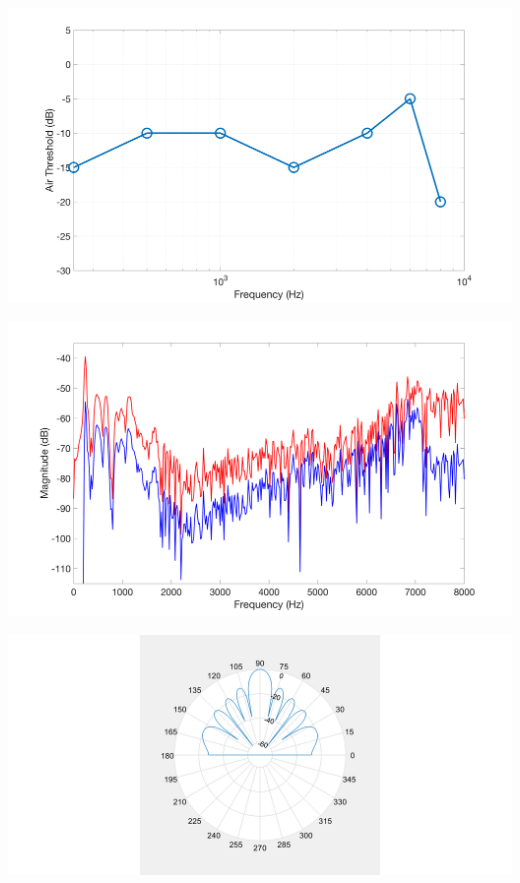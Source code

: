\documentclass[landscape,a1paper,fontscale=0.45]{baposter} %
\begin{document}
\begin{poster}
{\begin{multicols}{2}
\begin{center}
	\includegraphics[width=0.8\linewidth]{audiogram.png}
\end{center}
\begin{center}
	\includegraphics[width=0.8\linewidth]{fftSoftwareBold.png}
\end{center}

\end{multicols}

\begin{multicols}{2}
	\vspace{1em}
	
	\begin{center}
		\includegraphics[width=0.8\linewidth]{polar90degSoftware.png}
	\end{center}


\end{multicols}}
\end{poster}
\end{document}
